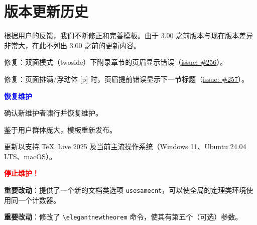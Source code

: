\documentclass[lang=cn,newtx,10pt,scheme=chinese]{elegantbook}
\begin{document}
\chapter{版本更新历史}

根据用户的反馈，我们不断修正和完善模板。由于 3.00 之前版本与现在版本差异非常大，在此不列出 3.00 之前的更新内容。


\begin{change}
  \item 修复：双面模式（twoside）下附录章节的页眉显示错误（\href{https://github.com/ElegantLaTeX/ElegantBook/issues/256}{issue: \#256}）。
  \item 修复：页面排满/浮动体 [p] 时，页眉提前错误显示下一节标题（\href{https://github.com/ElegantLaTeX/ElegantBook/issues/257}{issue: \#257}）。
\end{change}

  \textcolor{blue}{\bfseries 恢复维护}

\begin{change}
  \item 确认新维护者啸行并恢复维护。
  \item 鉴于用户群体庞大，模板重新发布。
  \item 更新以支持 \TeX~Live 2025 及当前主流操作系统（Windows 11、Ubuntu 24.04 LTS、macOS）。
\end{change}

 \textcolor{red}{\bfseries 停止维护！}

\begin{change}
  \item \textbf{重要改动}：提供了一个新的文档类选项 \lstinline|usesamecnt|，可以使全局的定理类环境使用同一个计数器。
  \item \textbf{重要改动}：修改了 \lstinline|\elegantnewtheorem| 命令，使其有第五个（可选）参数。
\end{change}

\end{document}
